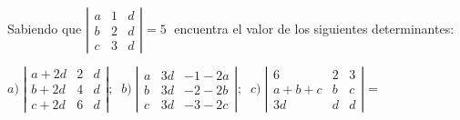 \begin{ejre}
Sabiendo que $\left| \begin{matrix} a&1&d\\b&2&d\\c&3&d \end{matrix} \right|=5\;$ encuentra el valor de los siguientes determinantes:

$a)\; \left| \begin{matrix} a+2d&2&d\\b+2d&4&d\\c+2d&6&d  \end{matrix} \right|; \;\;
b)\; \left| \begin{matrix} a&3d&-1-2a\\b&3d&-2-2b\\c&3d&-3-2c  \end{matrix} \right|; \;\;
c)\; \left| \begin{matrix} 6&2&3\\a+b+c&b&c\\3d&d&d  \end{matrix} \right| =$
 
\end{ejre}

